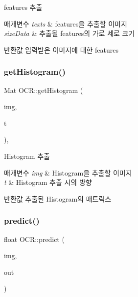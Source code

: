 features 추출 


\begin{DoxyParams}{매개변수}
{\em texts} & features을 추출할 이미지 \\
\hline
{\em size\+Data} & 추출될 features의 가로 세로 크기 \\
\hline
\end{DoxyParams}
\begin{DoxyReturn}{반환값}
입력받은 이미지에 대한 features 
\end{DoxyReturn}
\mbox{\label{class_o_c_r_af4dd76ed4fdaeb65ca3768755d7e3033}} 
\subsubsection{\texorpdfstring{get\+Histogram()}{getHistogram()}}
{\footnotesize\ttfamily Mat O\+C\+R\+::get\+Histogram (\begin{DoxyParamCaption}\item[{const cv\+::\+Mat \&}]{img,  }\item[{const \hyperlink{class_o_c_r_ad50a9d013dc2ee50341eee5b9e326686}{O\+R\+I\+E\+N\+T\+A\+T\+I\+ON}}]{t }\end{DoxyParamCaption})\hspace{0.3cm}{\ttfamily [static]}, {\ttfamily [private]}}



Histogram 추출 


\begin{DoxyParams}{매개변수}
{\em img} & Histogram을 추출할 이미지 \\
\hline
{\em t} & Histogram 추출 시의 방향 \\
\hline
\end{DoxyParams}
\begin{DoxyReturn}{반환값}
추출된 Histogram의 매트릭스 
\end{DoxyReturn}
\mbox{\label{class_o_c_r_aee086012d86e877ac029cdde3927a221}} 
\subsubsection{\texorpdfstring{predict()}{predict()}}
{\footnotesize\ttfamily float O\+C\+R\+::predict (\begin{DoxyParamCaption}\item[{const cv\+::\+Mat \&}]{img,  }\item[{cv\+::\+Mat $\ast$}]{out }\end{DoxyParamCaption})}



